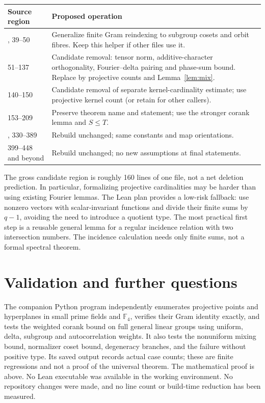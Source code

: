 \documentclass[11pt]{article}
\theoremstyle{remark}\newtheorem{remark}[theorem]{Remark}
\newcommand{\F}{\mathbb F}
\newcommand{\code}[1]{\texttt{\detokenize{#1}}}
\begin{document}
\begin{center}\small
\begin{tabular}{p{.31\linewidth}p{.59\linewidth}}
\toprule
Source region & Proposed operation \\
\midrule
\code{PositiveType.lean}, 39--50 & Generalize finite Gram reindexing to subgroup cosets and orbit fibres. Keep this helper if other files use it. \\
51--137 & Candidate removal: tensor norm, additive-character orthogonality, Fourier--delta pairing and phase-sum bound. Replace by projective counts and Lemma~\ref{lem:mix}. \\
140--150 & Candidate removal of separate kernel-cardinality estimate; use projective kernel count (or retain for other callers). \\
153--209 & Preserve theorem name and statement; use the stronger corank lemma and $S\le T$. \\
\code{MomentBounds.lean}, 330--389 & Rebuild unchanged; same constants and map orientations. \\
399--448 and beyond & Rebuild unchanged; no new assumptions at final statements. \\
\bottomrule
\end{tabular}
\end{center}
The gross candidate region is roughly 160 lines of one file, not a net deletion prediction. In particular, formalizing projective cardinalities may be harder than using existing Fourier lemmas. The Lean plan provides a low-risk fallback: use nonzero vectors with scalar-invariant functions and divide their finite sums by $q-1$, avoiding the need to introduce a quotient type. The most practical first step is a reusable general lemma for a regular incidence relation with two intersection numbers. The incidence calculation needs only finite sums, not a formal spectral theorem.

\section{Validation and further questions}
The companion Python program independently enumerates projective points and hyperplanes in small prime fields and $\F_4$, verifies their Gram identity exactly, and tests the weighted corank bound on full general linear groups using uniform, delta, subgroup and autocorrelation weights. It also tests the nonuniform mixing bound, normalizer coset bound, degeneracy branches, and the failure without positive type. Its saved output records actual case counts; these are finite regressions and not a proof of the universal theorem. The mathematical proof is above. No Lean executable was available in the working environment. No repository changes were made, and no line count or build-time reduction has been measured.
\end{document}
